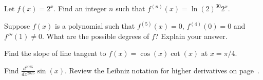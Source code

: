 \documentclass[../main.tex]{subfiles}
\begin{document}
  \begin{example}
    Let \(f(x) = 2^{x}\). Find an integer \(n\) such that \(f^{(n)}(x) = \ln(2)^{30} 2^{x}\).

  \end{example}

  \begin{example}
    Suppose \(f(x)\) is a polynomial such that \(f^{(5)}(x) = 0\), \(f^{(4)}(0) = 0\) and \(f'''(1) \ne 0\). What are the possible degrees of \(f\)? Explain your answer.

  \end{example}
  \clearpage

  \begin{example}
    Find the slope of line tangent to \(f(x) = \cos(x)\cot(x)\) at \(x = \pi/4\). 
  \end{example}

  \begin{example}
    Find \(\frac{d^{2025}}{dx^{2025}} \sin(x)\). Review the Leibniz notation for higher derivatives on page~\pageref{page:higher-derivatives}.

  \end{example}
\end{document}
